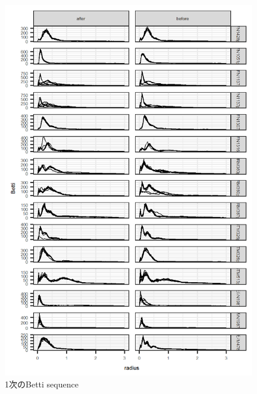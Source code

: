 \documentclass{jarticle}
\begin{document}
\begin{figure}[htbp]
\begin{center}
	\includegraphics[width=11cm]{fig/betti_1.png}	
	\caption{1次のBetti sequence}\label{fig:betti1}
\end{center}
\end{figure}
\end{document}
